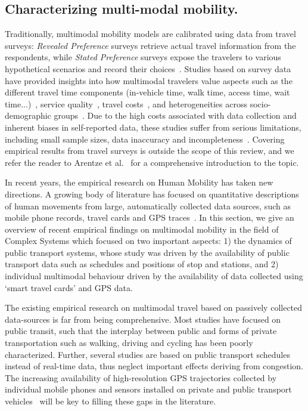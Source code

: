\subsection{Characterizing multi-modal mobility. \label{mobility_2}}

Traditionally, multimodal mobility models are calibrated using data from travel surveys: \emph{Revealed Preference} surveys retrieve actual travel information from the respondents, while \emph{Stated Preference} surveys expose the travelers to various hypothetical scenarios and record their choices~\cite{arentze2013travelers}. Studies based on survey data have provided insights into how multimodal travelers value aspects such as the different travel time components (in-vehicle time, walk time, access time, wait time...)~\cite{abrantes2011meta}, service quality~\cite{wardman2001review}, travel costs~\cite{arentze2013travelers}, and heterogeneities across socio-demographic groups~\cite{nobis2007multimodality}. Due to the high costs associated with data collection and inherent biases in self-reported data, these studies suffer from serious limitations, including small sample sizes, data inaccuracy and incompleteness~\cite{chen2016promises,zannat2019emerging}. Covering empirical results from travel surveys is outside the scope of this review, and we refer the reader to Arentze et al.~\cite{arentze2013travelers} for a comprehensive introduction to the topic.

In recent years, the empirical research on Human Mobility has taken new directions. A growing body of literature has focused on quantitative descriptions of human movements from large, automatically collected data sources, such as mobile phone records, travel cards and GPS traces~\cite{barbosa2018human}. In this section, we give an overview of recent empirical findings on multimodal mobility in the field of Complex Systems which focused on two important aspects: 1) the dynamics of public transport systems, whose study was driven by the availability of public transport data such as schedules and positions of stop and stations, and 2) individual multimodal behaviour driven by the availability of data collected using `smart travel cards' and GPS data. 

The existing empirical research on multimodal travel based on passively collected data-sources is far from being comprehensive. Most studies have focused on public transit, such that the interplay between public and forms of private transportation such as walking, driving and cycling has been poorly characterized. Further, several studies are based on public transport schedules instead of real-time data, thus neglect important effects deriving from congestion. The increasing availability of high-resolution GPS trajectories collected by individual mobile phones and sensors installed on private and public transport vehicles~\cite{barbosa2018human} will be key to filling these gaps in the literature.


